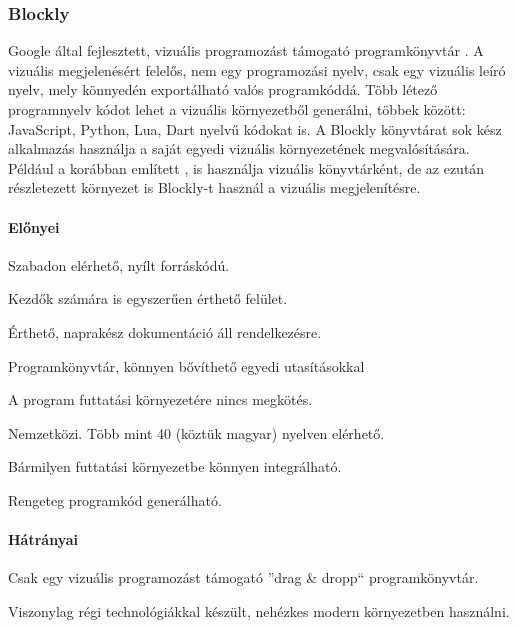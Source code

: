 \documentclass[12pt,a4paper,oneside]{report} %
\begin{document}
\subsubsection{Blockly}
\label{blocly}
Google által fejlesztett, vizuális programozást támogató programkönyvtár \cite{BlocklyUrl2020Feb} \cite{pasternak2017tips}. A vizuális megjelenésért felelős, nem egy programozási nyelv, csak egy vizuális leíró nyelv, mely könnyedén exportálható valós programkóddá. Több létező programnyelv kódot lehet a vizuális környezetből generálni, többek között: JavaScript, Python, Lua, Dart nyelvű kódokat is. A Blockly könyvtárat sok kész alkalmazás használja a saját egyedi vizuális környezetének megvalósítására.
Például a korábban említett ,  is használja vizuális könyvtárként, de az ezután részletezett  környezet is Blockly-t használ a vizuális megjelenítésre.
\paragraph{Előnyei} 
\begin{compactitem}
	\item Szabadon elérhető, nyílt forráskódú.
	\item Kezdők számára is egyszerűen érthető felület.
	\item Érthető, naprakész dokumentáció áll rendelkezésre.
	\item Programkönyvtár, könnyen bővíthető egyedi utasításokkal
	\item A program futtatási környezetére nincs megkötés.
	\item Nemzetközi. Több mint 40 (köztük magyar) nyelven elérhető.
	\item Bármilyen futtatási környezetbe könnyen integrálható.
	\item Rengeteg programkód generálható.
\end{compactitem}
\paragraph{Hátrányai} 
\begin{compactitem}
	\item Csak egy vizuális programozást támogató  ''drag \& dropp`` programkönyvtár.
	\item Viszonylag régi technológiákkal készült, nehézkes modern környezetben használni.
\end{compactitem}
\end{document}
